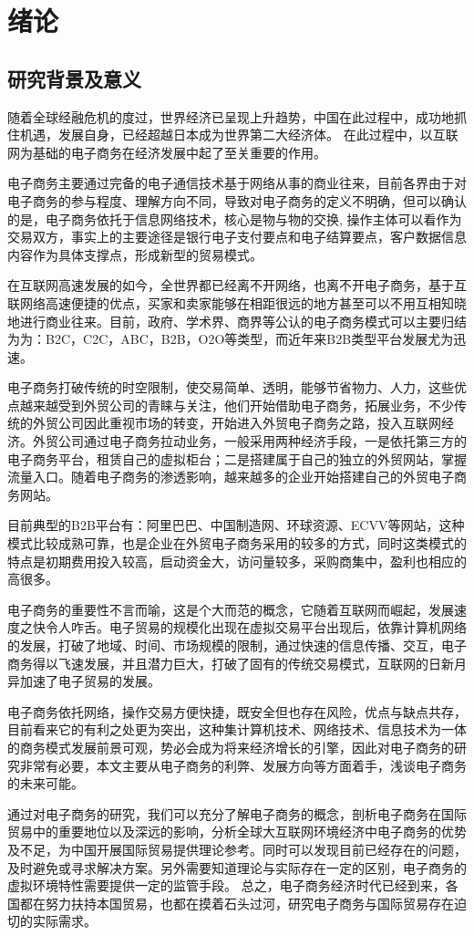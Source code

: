 \chapter{绪论}
\section{研究背景及意义}
随着全球经融危机的度过，世界经济已呈现上升趋势，中国在此过程中，成功地抓住机遇，发展自身，已经超越日本成为世界第二大经济体。
在此过程中，以互联网为基础的电子商务在经济发展中起了至关重要的作用。

电子商务主要通过完备的电子通信技术基于网络从事的商业往来，目前各界由于对电子商务的参与程度、理解方向不同，导致对电子商务的定义不明确，但可以确认的是，电子商务依托于信息网络技术，核心是物与物的交换,
操作主体可以看作为交易双方，事实上的主要途径是银行电子支付要点和电子结算要点，客户数据信息内容作为具体支撑点，形成新型的贸易模式。

在互联网高速发展的如今，全世界都已经离不开网络，也离不开电子商务，基于互联网络高速便捷的优点，买家和卖家能够在相距很远的地方甚至可以不用互相知晓地进行商业往来。目前，政府、学术界、商界等公认的电子商务模式可以主要归结为为：B2C，C2C，ABC，B2B，O2O等类型，而近年来B2B类型平台发展尤为迅速。

电子商务打破传统的时空限制，使交易简单、透明，能够节省物力、人力，这些优点越来越受到外贸公司的青睐与关注，他们开始借助电子商务，拓展业务，不少传统的外贸公司因此重视市场的转变，开始进入外贸电子商务之路，投入互联网经济。外贸公司通过电子商务拉动业务，一般采用两种经济手段，一是依托第三方的电子商务平台，租赁自己的虚拟柜台；二是搭建属于自己的独立的外贸网站，掌握流量入口。随着电子商务的渗透影响，越来越多的企业开始搭建自己的外贸电子商务网站。

目前典型的B2B平台有：阿里巴巴、中国制造网、环球资源、ECVV等网站，这种模式比较成熟可靠，也是企业在外贸电子商务采用的较多的方式，同时这类模式的特点是初期费用投入较高，启动资金大，访问量较多，采购商集中，盈利也相应的高很多。

电子商务的重要性不言而喻，这是个大而范的概念，它随着互联网而崛起，发展速度之快令人咋舌。电子贸易的规模化出现在虚拟交易平台出现后，依靠计算机网络的发展，打破了地域、时间、市场规模的限制，通过快速的信息传播、交互，电子商务得以飞速发展，并且潜力巨大，打破了固有的传统交易模式，互联网的日新月异加速了电子贸易的发展。

电子商务依托网络，操作交易方便快捷，既安全但也存在风险，优点与缺点共存，目前看来它的有利之处更为突出，这种集计算机技术、网络技术、信息技术为一体的商务模式发展前景可观，势必会成为将来经济增长的引擎，因此对电子商务的研究非常有必要，本文主要从电子商务的利弊、发展方向等方面着手，浅谈电子商务的未来可能。

通过对电子商务的研究，我们可以充分了解电子商务的概念，剖析电子商务在国际贸易中的重要地位以及深远的影响，分析全球大互联网环境经济中电子商务的优势及不足，为中国开展国际贸易提供理论参考。同时可以发现目前已经存在的问题，及时避免或寻求解决方案。另外需要知道理论与实际存在一定的区别，电子商务的虚拟环境特性需要提供一定的监管手段。
总之，电子商务经济时代已经到来，各国都在努力扶持本国贸易，也都在摸着石头过河，研究电子商务与国际贸易存在迫切的实际需求。

